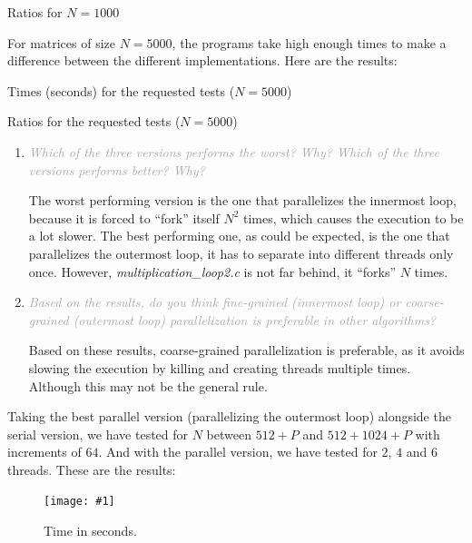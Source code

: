 \documentclass{article}
\newcommand{\myFigure}[4]{%
    \begin{figure}[!ht]
        \texttt{[image: \#1]}
        \centering
        \caption{#2}
        \label{#3}
    \end{figure}
}
\newcommand{\greyItem}[1]{\item\emph{\textcolor{darkgray}{#1}}}
\begin{document}
\begin{table}[h]
    
    \centering
    \caption{Ratios for $N=1000$}
\end{table}

For matrices of size $N=5000$, the programs take high enough times to make a difference between the different implementations. Here are the results:

\begin{table}[!h]
    
    \centering
    \caption{Times (seconds) for the requested tests ($N=5000$)}
    \label{5000_times}
\end{table}

\begin{table}[!h]
    
    \centering
    \caption{Ratios for the requested tests ($N=5000$)}
    \label{5000_ratios}
\end{table}

\begin{enumerate}[label=3.\arabic*,leftmargin=*]
\greyItem{ Which of the three versions performs the worst? Why? Which of the three versions performs better? Why?}

The worst performing version is the one that parallelizes the innermost loop, because it is forced to ``fork'' itself $N^2$ times, which causes the execution to be a lot slower. The best performing one, as could be expected, is the one that parallelizes the outermost loop, it has to separate into different threads only once. However, \emph{multiplication\_loop2.c} is not far behind, it ``forks'' $N$ times.

\greyItem{Based on the results, do you think fine-grained (innermost loop) or coarse-grained (outermost loop) parallelization is preferable in other algorithms?}

Based on these results, coarse-grained parallelization is preferable, as it avoids slowing the execution by killing and creating threads multiple times. Although this may not be the general rule.

\end{enumerate}

Taking the best parallel version (parallelizing the outermost loop) alongside the serial version, we have tested for $N$ between $512+P$ and $512+1024+P$ with increments of $64$. And with the parallel version, we have tested for $2$, $4$ and $6$ threads. These are the results: 

\myFigure{../material/outputs/out3/test_cl0/t_fig.png}{Time in seconds.}{times_e3}{0.65}
\end{document}
